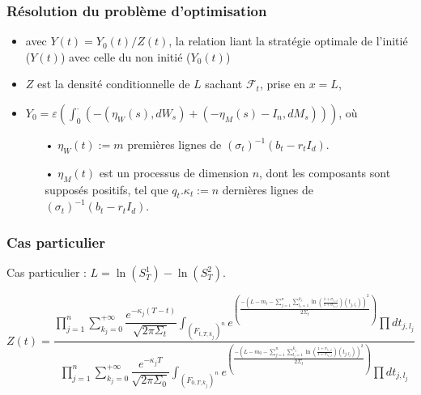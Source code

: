 \documentclass{beamer}
\begin{document}
\begin{frame}
\frametitle{Résolution du problème d'optimisation}
\begin{itemize}
\item avec $Y(t) = Y_0(t) / Z(t)$, la relation liant la stratégie optimale de l'initié ($Y(t)$) avec celle du non initié ($Y_0(t)$)\\
\item $Z$ est la densité conditionnelle de $L$ sachant $\mathcal{F}_t$, prise en $x = L$,
\item $Y_0 = \varepsilon \left(\displaystyle \int_{0}^{\cdot} \left(- \left( \eta_W \left( s \right), dW_s \right) + \left( - \eta_M \left(  s \right) - I_n, dM_s \right) \right)\right)$, où
\begin{itemize}
\item[•] $\eta_W \left( t \right) := m$ premières lignes de $(\sigma_t)^{-1}(b_t - r_t I_d)$.\
\item[•] $ \eta_M \left( t \right)$ est un processus de dimension $n$, dont les composants sont supposés positifs, tel que $q_t. \kappa_t := n$ dernières lignes de $(\sigma_t)^{-1}(b_t - r_t I_d)$.
\end{itemize}
\end{itemize}
\end{frame}


\begin{frame}
\frametitle{Cas particulier}
\par Cas particulier : $L = \ln \left( S_T^{1} \right) - \ln \left( S_T^{2} \right)$.

\small
\begin{displaymath}
Z \left( t \right) = \dfrac{\prod\limits_{j = 1}^{n} \sum\limits_{k_j = 0}^{+ \infty} \dfrac{e^{- {\kappa}_j \left( T - t\right)}}{\sqrt{2 \pi {\Sigma}_t}} {\displaystyle \int_{{\left( F_{t, T, k_j}\right)}^n}} e^{\left( \frac{- \left( L - m_t - \sum\limits_{j = 1}^{n} \sum\limits_{l_j = 1}^{k_j} \ln \left( \frac{1 + {\sigma}_{i_1, j}}{1 + {\sigma}_{i_2, j}} \right) \left( t_{j, l_j} \right) \right)^2}{2 {\Sigma}_t} \right)} \prod d t_{j, l_j}}{\prod\limits_{j = 1}^{n} \sum\limits_{k_j = 0}^{+ \infty} \dfrac{e^{- {\kappa}_j T}}{\sqrt{2 \pi {\Sigma}_0}} {\displaystyle \int_{{\left( F_{0, T, k_j}\right)}^n}} e^{\left( \frac{- \left( L - m_0 - \sum\limits_{j = 1}^{n} \sum\limits_{l_j = 1}^{k_j} \ln \left( \frac{1 + {\sigma}_{i_1, j}}{1 + {\sigma}_{i_2, j}} \right) \left( t_{j, l_j} \right) \right)^2}{2 {\Sigma}_t} \right)} \prod d t_{j, l_j}}
\end{displaymath}
\end{frame}
\end{document}

